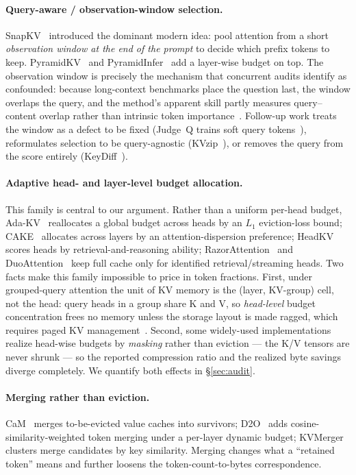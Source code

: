 \paragraph{Query-aware / observation-window selection.}
SnapKV~\cite{li2024snapkv} introduced the dominant modern idea: pool attention from a short
\emph{observation window at the end of the prompt} to decide which prefix tokens to keep.
PyramidKV~\cite{cai2024pyramidkv} and PyramidInfer~\cite{zhang2024pyramidinfer} add a layer-wise
budget on top. The observation window is precisely the mechanism that concurrent audits identify as
confounded: because long-context benchmarks place the question last, the window overlaps the query,
and the method's apparent skill partly measures query--content overlap rather than intrinsic token
importance~\cite{luo2026queryvisibility}. Follow-up work treats the window as a defect to be fixed
(Judge~Q trains soft query tokens~\cite{liu2025judgeq}), reformulates selection to be query-agnostic
(KVzip~\cite{jang2025kvzip}), or removes the query from the score entirely (KeyDiff~\cite{park2025keydiff}).

\paragraph{Adaptive head- and layer-level budget allocation.}
This family is central to our argument. Rather than a uniform per-head budget, Ada-KV~\cite{feng2025adakv}
reallocates a global budget across heads by an $L_1$ eviction-loss bound; CAKE~\cite{qin2025cake}
allocates across layers by an attention-dispersion preference; HeadKV~\cite{fu2025headkv} scores
heads by retrieval-and-reasoning ability; RazorAttention~\cite{tang2025razorattention} and
DuoAttention~\cite{xiao2025duoattention} keep full cache only for identified retrieval/streaming
heads. Two facts make this family impossible to price in token fractions. First, under grouped-query
attention the unit of KV memory is the (layer, KV-group) cell, not the head: query heads in a group
share K and V, so \emph{head-level} budget concentration frees no memory unless the storage layout is
made ragged, which requires paged KV management~\cite{rehg2024kvcompress}. Second, some widely-used
implementations realize head-wise budgets by \emph{masking} rather than eviction --- the K/V tensors
are never shrunk --- so the reported compression ratio and the realized byte savings diverge
completely. We quantify both effects in \S\ref{sec:audit}.

\paragraph{Merging rather than eviction.}
CaM~\cite{zhang2024cam} merges to-be-evicted value caches into survivors; D2O~\cite{wan2025d2o}
adds cosine-similarity-weighted token merging under a per-layer dynamic budget; KVMerger~\cite{wang2024kvmerger}
clusters merge candidates by key similarity. Merging changes what a ``retained token'' means and
further loosens the token-count-to-bytes correspondence.

